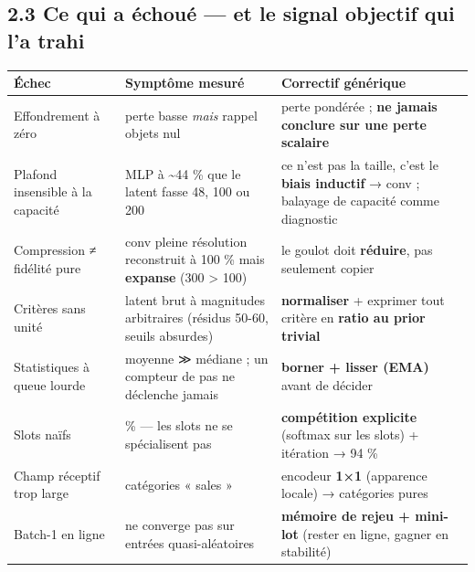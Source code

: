 \documentclass[
  french,
  11pt,
]{article}
\newcounter{none} %
\begin{document}
\subsection{2.3 Ce qui a échoué --- et le signal objectif qui l'a
trahi}\label{ce-qui-a-uxe9chouuxe9-et-le-signal-objectif-qui-la-trahi}

{\def\LTcaptype{none} %
\begin{longtable}[]{@{}
  >{\raggedright\arraybackslash}p{}
  >{\raggedright\arraybackslash}p{}
  >{\raggedright\arraybackslash}p{}@{}}
\toprule\noalign{}
\begin{minipage}[b]{\linewidth}\raggedright
Échec
\end{minipage} & \begin{minipage}[b]{\linewidth}\raggedright
Symptôme mesuré
\end{minipage} & \begin{minipage}[b]{\linewidth}\raggedright
Correctif générique
\end{minipage} \\
\midrule\noalign{}
\endhead
\bottomrule\noalign{}
\endlastfoot
Effondrement à zéro & perte basse \emph{mais} rappel objets nul & perte
pondérée ; \textbf{ne jamais conclure sur une perte scalaire} \\
Plafond insensible à la capacité & MLP à \textasciitilde44 \% que le
latent fasse 48, 100 ou 200 & ce n'est pas la taille, c'est le
\textbf{biais inductif} → conv ; balayage de capacité comme
diagnostic \\
Compression ≠ fidélité pure & conv pleine résolution reconstruit à 100
\% mais \textbf{expanse} (300 \textgreater{} 100) & le goulot doit
\textbf{réduire}, pas seulement copier \\
Critères sans unité & latent brut à magnitudes arbitraires (résidus
50-60, seuils absurdes) & \textbf{normaliser} + exprimer tout critère en
\textbf{ratio au prior trivial} \\
Statistiques à queue lourde & moyenne ≫ médiane ; un compteur de pas ne
déclenche jamais & \textbf{borner + lisser (EMA)} avant de décider \\
Slots naïfs & 21 \% --- les slots ne se spécialisent pas &
\textbf{compétition explicite} (softmax sur les slots) + itération → 94
\% \\
Champ réceptif trop large & catégories « sales » & encodeur \textbf{1×1}
(apparence locale) → catégories pures \\
Batch-1 en ligne & ne converge pas sur entrées quasi-aléatoires &
\textbf{mémoire de rejeu + mini-lot} (rester en ligne, gagner en
stabilité) \\
\end{longtable}
}
\end{document}
